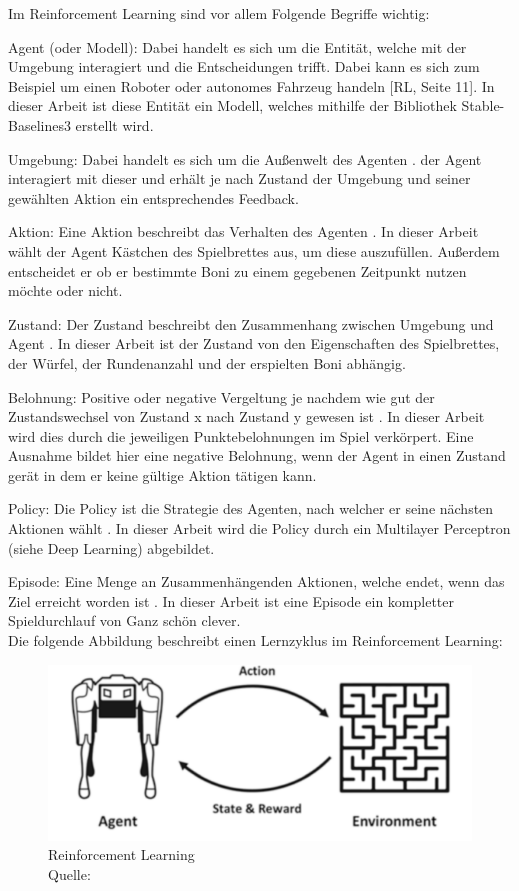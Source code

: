Im Reinforcement Learning sind vor allem Folgende Begriffe wichtig:

Agent (oder Modell): Dabei handelt es sich um die Entität, welche mit der Umgebung interagiert und die Entscheidungen trifft. Dabei kann es sich zum Beispiel um einen Roboter oder autonomes Fahrzeug handeln [RL, Seite 11]. In dieser Arbeit ist diese Entität ein Modell, welches mithilfe der Bibliothek Stable-Baselines3 erstellt wird.

Umgebung: Dabei handelt es sich um die Außenwelt des Agenten \cite[Seite 11]{ris-ala_fundamentals_2023}. der Agent interagiert mit dieser und erhält je nach Zustand der Umgebung und seiner gewählten Aktion ein entsprechendes Feedback.

Aktion: Eine Aktion beschreibt das Verhalten des Agenten \cite[Seite 11]{ris-ala_fundamentals_2023}. In dieser Arbeit wählt der Agent Kästchen des Spielbrettes aus, um diese auszufüllen. Außerdem entscheidet er ob er bestimmte Boni zu einem gegebenen Zeitpunkt nutzen möchte oder nicht.

Zustand: Der Zustand beschreibt den Zusammenhang zwischen Umgebung und Agent \cite[Seite 11]{ris-ala_fundamentals_2023}. In dieser Arbeit ist der Zustand von den Eigenschaften des Spielbrettes, der Würfel, der Rundenanzahl und der erspielten Boni abhängig.

Belohnung: Positive oder negative Vergeltung je nachdem wie gut der Zustandswechsel von Zustand x nach Zustand y gewesen ist \cite[Seite 11]{ris-ala_fundamentals_2023}. In dieser Arbeit wird dies durch die jeweiligen Punktebelohnungen im Spiel verkörpert. Eine Ausnahme bildet hier eine negative Belohnung, wenn der Agent in einen Zustand gerät in dem er keine gültige Aktion tätigen kann.

Policy: Die Policy ist die Strategie des Agenten, nach welcher er seine nächsten Aktionen wählt \cite[Seite 11]{ris-ala_fundamentals_2023}. In dieser Arbeit wird die Policy durch ein Multilayer Perceptron (siehe Deep Learning) abgebildet.

Episode: Eine Menge an Zusammenhängenden Aktionen, welche endet, wenn das Ziel erreicht worden ist \cite[Seite 11]{ris-ala_fundamentals_2023}. In dieser Arbeit ist eine Episode ein kompletter Spieldurchlauf von Ganz schön clever.\\

	Die folgende Abbildung beschreibt einen Lernzyklus im Reinforcement Learning:
\nopagebreak
\begin{figure}[h]
\includegraphics[width=1\textwidth]{Bilder/rl} 
\caption[Reinforcement Learning]{Reinforcement Learning\\ Quelle: \cite{ris-ala_fundamentals_2023}}
\end{figure}

